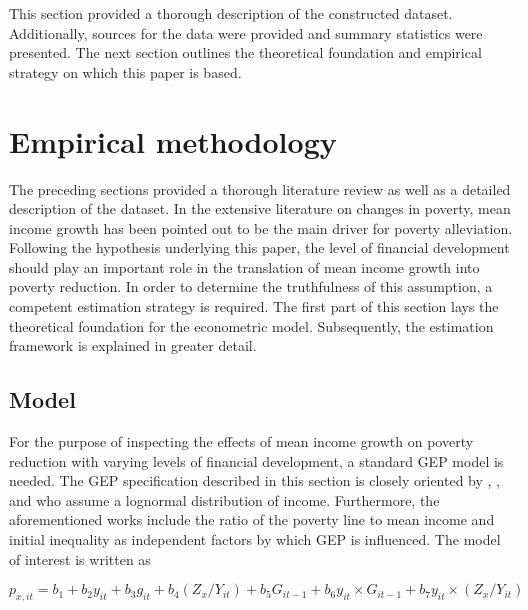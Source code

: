 \documentclass[12pt, a4paper]{article}
\begin{document}
This section provided a thorough description of the constructed dataset. Additionally, sources for the data were provided and summary statistics were presented. The next section outlines the theoretical foundation and empirical strategy on which this paper is based.

\newpage
\section{Empirical methodology} \label{methodology}

The preceding sections provided a thorough literature review as well as a detailed description of the dataset. In the extensive literature on changes in poverty, mean income growth has been pointed out to be the main driver for poverty alleviation. Following the hypothesis underlying this paper, the level of financial development should play an important role in the translation of mean income growth into poverty reduction. In order to determine the truthfulness of this assumption, a competent estimation strategy is required. The first part of this section lays the theoretical foundation for the econometric model. Subsequently, the estimation framework is explained in greater detail.

\subsection{Model}

For the purpose of inspecting the effects of mean income growth on poverty reduction with varying levels of financial development, a standard GEP model is needed. The GEP specification described in this section is closely oriented by , ,  and  who assume a lognormal distribution of income. Furthermore, the aforementioned works include the ratio of the poverty line to mean income and initial inequality as independent factors by which GEP is influenced. The model of interest is written as

\begin{equation} \label{eq:1}
p_{x,it} = b_{1} + b_{2}y_{it} + b_{3}g_{it} + b_{4}(Z_{x}/Y_{it}) + b_{5}G_{it-1} + b_{6}y_{it}\times G_{it-1} + b_{7}y_{it}\times (Z_{x}/Y_{it})
\end{equation}
\end{document}
